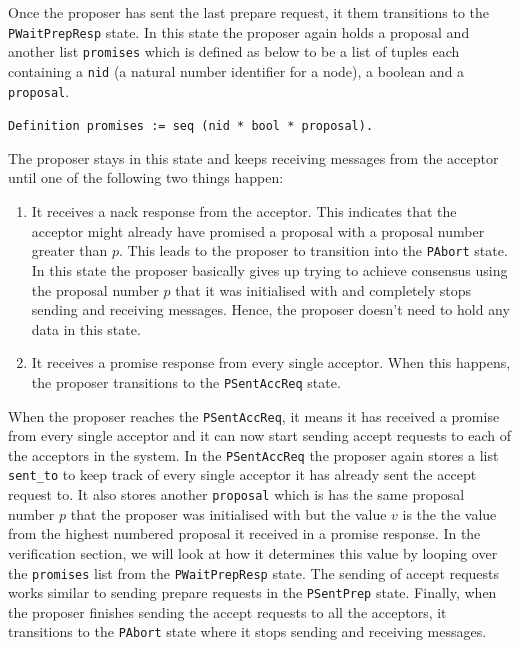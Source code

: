 Once the proposer has sent the last prepare request, it them transitions to
the \texttt{PWaitPrepResp} state. In this state the proposer again holds a proposal and
another list \texttt{promises} which is defined as below to be a list of tuples
each containing a \texttt{nid} (a natural number identifier for a node), a boolean
and a \texttt{proposal}.

\texttt{Definition promises := seq (nid * bool * proposal).}

The proposer stays in this state and keeps receiving messages from the acceptor
until one of the following two things happen:
\begin{enumerate}
  \item It receives a nack response from the acceptor. This indicates that the
    acceptor might already have promised a proposal
    with a proposal number greater than $p$. This leads to the proposer to
    transition into the \texttt{PAbort} state. In this state the proposer basically
    gives up trying to achieve consensus using the proposal number $p$ that it was
    initialised with and completely stops sending and receiving messages. Hence,
    the proposer doesn't need to hold any data in this state.
  \item It receives a promise response from every single acceptor. When this
    happens, the proposer transitions to the \texttt{PSentAccReq} state.
\end{enumerate}

When the proposer reaches the \texttt{PSentAccReq}, it means it has received a promise
from every single acceptor and it can now start sending accept requests to each
of the acceptors in the system. In the \texttt{PSentAccReq} the proposer again stores
a list \texttt{sent\_to} to keep track of every single acceptor it has already sent the
accept request to. It also stores another \texttt{proposal} which is has the same
proposal number $p$ that the proposer was initialised with but the value $v$ is the
the value from the highest numbered proposal it received in a promise response.
In the verification section, we will look at how it determines this value by looping over
the \texttt{promises} list from the \texttt{PWaitPrepResp} state. The sending of
accept requests works similar to sending prepare requests in the
\texttt{PSentPrep} state. Finally, when the proposer finishes sending the
accept requests to all the acceptors, it transitions to the \texttt{PAbort}
state where it stops sending and receiving messages.


